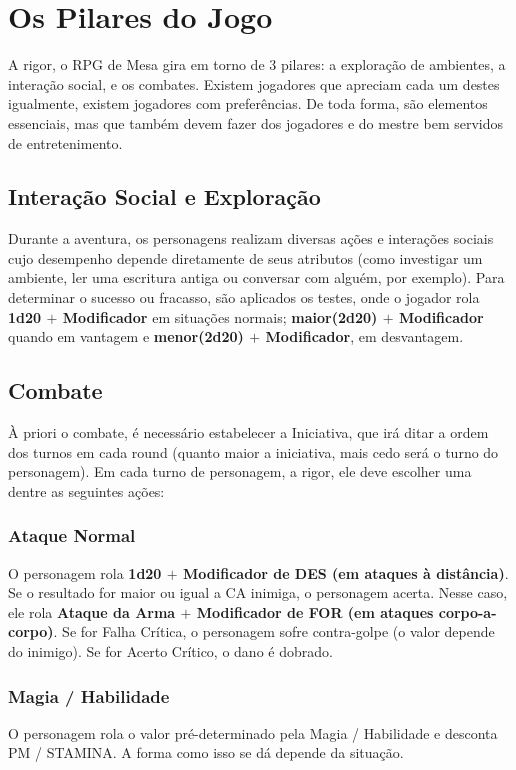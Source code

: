 \documentclass[10pt,twoside,twocolumn]{book}
\begin{document}
\section{Os Pilares do Jogo}
A rigor, o RPG de Mesa gira em torno de 3 pilares: a exploração de ambientes, a interação social, e os combates. Existem jogadores que apreciam cada um destes igualmente, existem jogadores com preferências. De toda forma, são elementos essenciais, mas que também devem fazer dos jogadores e do mestre bem servidos de entretenimento.

\subsection{Interação Social e Exploração}
Durante a aventura, os personagens realizam diversas ações e interações sociais cujo desempenho depende diretamente de seus atributos (como investigar um ambiente, ler uma escritura antiga ou conversar com alguém, por exemplo). Para determinar o sucesso ou fracasso, são aplicados os testes, onde o jogador rola \textbf{1d20 $+$ Modificador} em situações normais; \textbf{maior(2d20) $+$ Modificador} quando em vantagem e \textbf{menor(2d20) $+$ Modificador}, em desvantagem.

\subsection{Combate}
À priori o combate, é necessário estabelecer a Iniciativa, que irá ditar a ordem dos turnos em cada round (quanto maior a iniciativa, mais cedo será o turno do personagem). Em cada turno de personagem, a rigor, ele deve escolher uma dentre as seguintes ações:

\subsubsection*{Ataque Normal}
O personagem rola \textbf{1d20 $+$ Modificador de DES (em ataques à distância)}. Se o resultado for maior ou igual a CA inimiga, o personagem acerta. Nesse caso, ele rola \textbf{Ataque da Arma $+$ Modificador de FOR (em ataques corpo-a-corpo)}. Se for Falha Crítica, o personagem sofre contra-golpe (o valor depende do inimigo). Se for Acerto Crítico, o dano é dobrado.

\subsubsection*{Magia / Habilidade}
O personagem rola o valor pré-determinado pela Magia / Habilidade e desconta PM / STAMINA. A forma como isso se dá depende da situação.
\end{document}
